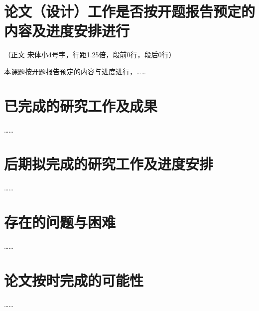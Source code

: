 
\section{论文（设计）工作是否按开题报告预定的内容及进度安排进行}

（正文  宋体小4号字，行距1.25倍，段前0行，段后0行）

本课题按开题报告预定的内容与进度进行，……

\section{已完成的研究工作及成果}

……

\section{后期拟完成的研究工作及进度安排}

……

\section{存在的问题与困难}

……

\section{论文按时完成的可能性}

……
